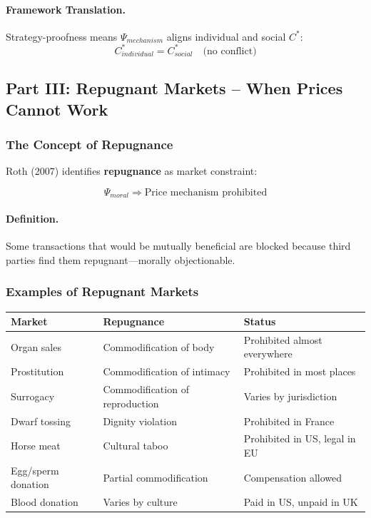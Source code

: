 \paragraph{Framework Translation.}
Strategy-proofness means $\Psi_{mechanism}$ aligns individual and social $C^*$:
\begin{equation}
C^*_{individual} = C^*_{social} \quad \text{(no conflict)}
\end{equation}

\subsection{Part III: Repugnant Markets – When Prices Cannot Work}

\subsubsection{The Concept of Repugnance}

Roth (2007) identifies \textbf{repugnance} as market constraint:

\begin{equation}
\boxed{
\Psi_{moral} \Rightarrow \text{Price mechanism prohibited}
}
\label{eq:repugnance}
\end{equation}

\paragraph{Definition.}
Some transactions that would be mutually beneficial are blocked because 
third parties find them repugnant---morally objectionable.

\subsubsection{Examples of Repugnant Markets}

\begin{center}
\renewcommand{\arraystretch}{1.3}
\begin{tabular}{|l|l|l|}
\hline
\textbf{Market} & \textbf{Repugnance} & \textbf{Status} \\
\hline
Organ sales & Commodification of body & Prohibited almost everywhere \\
Prostitution & Commodification of intimacy & Prohibited in most places \\
Surrogacy & Commodification of reproduction & Varies by jurisdiction \\
Dwarf tossing & Dignity violation & Prohibited in France \\
Horse meat & Cultural taboo & Prohibited in US, legal in EU \\
Egg/sperm donation & Partial commodification & Compensation allowed \\
Blood donation & Varies by culture & Paid in US, unpaid in UK \\
\hline
\end{tabular}
\end{center}

